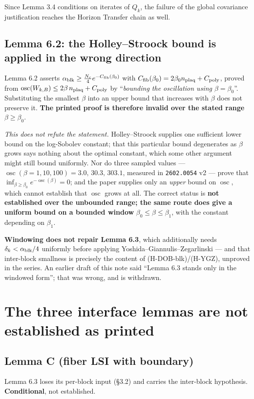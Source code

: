 \documentclass[11pt]{article}
\begin{document}
Since Lemma 3.4 conditions on iterates of $Q_k$, the failure of the global covariance
justification reaches the Horizon Transfer chain as well.

\subsection{Lemma 6.2: the Holley--Stroock bound is applied in the wrong direction}

Lemma 6.2 asserts $\alpha_{\rm blk}\ge\frac{N_c}{4}e^{-C_{\rm fib}(\beta_0)}$ with
$C_{\rm fib}(\beta_0)=2\beta_0 n_{\rm plaq}+C_{\rm poly}$, proved from
$\operatorname{osc}(W_{k,B})\le2\beta\,n_{\rm plaq}+C_{\rm poly}$ by ``\emph{bounding
the oscillation using $\beta=\beta_0$}''. Substituting the smallest $\beta$ into an
upper bound that increases with $\beta$ does not preserve it. \textbf{The printed
proof is therefore invalid over the stated range} $\beta\ge\beta_0$.

\emph{This does not refute the statement.} Holley--Stroock supplies one sufficient
lower bound on the log-Sobolev constant; that this particular bound degenerates as
$\beta$ grows says nothing about the optimal constant, which some other argument might
still bound uniformly. Nor do three sampled values --- $\operatorname{osc}
(\beta=1,10,100)=3.0,\,30.3,\,303.1$, measured in \texttt{2602.0054} v2 --- prove that
$\inf_{\beta\ge\beta_0}e^{-\operatorname{osc}(\beta)}=0$; and the paper supplies only
an \emph{upper} bound on $\operatorname{osc}$, which cannot establish that
$\operatorname{osc}$ grows at all. The correct status is \textbf{not established over
the unbounded range; the same route does give a uniform bound on a bounded window}
$\beta_0\le\beta\le\beta_1$, with the constant depending on $\beta_1$.

\textbf{Windowing does not repair Lemma 6.3}, which additionally needs
$\delta_k<\alpha_{\rm blk}/4$ uniformly before applying
Yoshida--Gian\-nulis--Zegarlinski --- and that inter-block smallness is precisely the
content of (H-DOB-blk)/(H-YGZ), unproved in the series. An earlier draft of this note
said ``Lemma 6.3 stands only in the windowed form''; that was wrong, and is withdrawn.

\section{The three interface lemmas are not established as printed}

\subsection{Lemma C (fiber LSI with boundary)} Lemma 6.3 loses its per-block input
(\S3.2) and carries the inter-block hypothesis. \textbf{Conditional}, not established.
\end{document}
